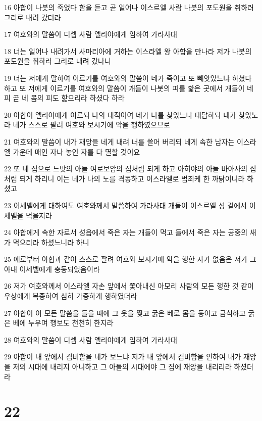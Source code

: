 \par 16 아합이 나봇의 죽었다 함을 듣고 곧 일어나 이스르엘 사람 나봇의 포도원을 취하러 그리로 내려 갔더라
\par 17 여호와의 말씀이 디셉 사람 엘리야에게 임하여 가라사대
\par 18 너는 일어나 내려가서 사마리아에 거하는 이스라엘 왕 아합을 만나라 저가 나봇의 포도원을 취하러 그리로 내려 갔나니
\par 19 너는 저에게 말하여 이르기를 여호와의 말씀이 네가 죽이고 또 빼앗았느냐 하셨다 하고 또 저에게 이르기를 여호와의 말씀이 개들이 나봇의 피를 핥은 곳에서 개들이 네 피 곧 네 몸의 피도 핥으리라 하셨다 하라
\par 20 아합이 엘리야에게 이르되 나의 대적이여 네가 나를 찾았느냐 대답하되 내가 찾았노라 네가 스스로 팔려 여호와 보시기에 악을 행하였으므로
\par 21 여호와의 말씀이 내가 재앙을 네게 내려 너를 쓸어 버리되 네게 속한 남자는 이스라엘 가운데 매인 자나 놓인 자를 다 멸할 것이요
\par 22 또 네 집으로 느밧의 아들 여로보암의 집처럼 되게 하고 아히야의 아들 바아사의 집처럼 되게 하리니 이는 네가 나의 노를 격동하고 이스라엘로 범죄케 한 까닭이니라 하셨고
\par 23 이세벨에게 대하여도 여호와께서 말씀하여 가라사대 개들이 이스르엘 성 곁에서 이세벨을 먹을지라
\par 24 아합에게 속한 자로서 성읍에서 죽은 자는 개들이 먹고 들에서 죽은 자는 공중의 새가 먹으리라 하셨느니라 하니
\par 25 예로부터 아합과 같이 스스로 팔려 여호와 보시기에 악을 행한 자가 없음은 저가 그 아내 이세벨에게 충동되었음이라
\par 26 저가 여호와께서 이스라엘 자손 앞에서 쫓아내신 아모리 사람의 모든 행한 것 같이 우상에게 복종하여 심히 가증하게 행하였더라
\par 27 아합이 이 모든 말씀을 들을 때에 그 옷을 찢고 굵은 베로 몸을 동이고 금식하고 굵은 베에 누우며 행보도 천천히 한지라
\par 28 여호와의 말씀이 디셉 사람 엘리야에게 임하여 가라사대
\par 29 아합이 내 앞에서 겸비함을 네가 보느냐 저가 내 앞에서 겸비함을 인하여 내가 재앙을 저의 시대에 내리지 아니하고 그 아들의 시대에야 그 집에 재앙을 내리리라 하셨더라

\chapter{22}

